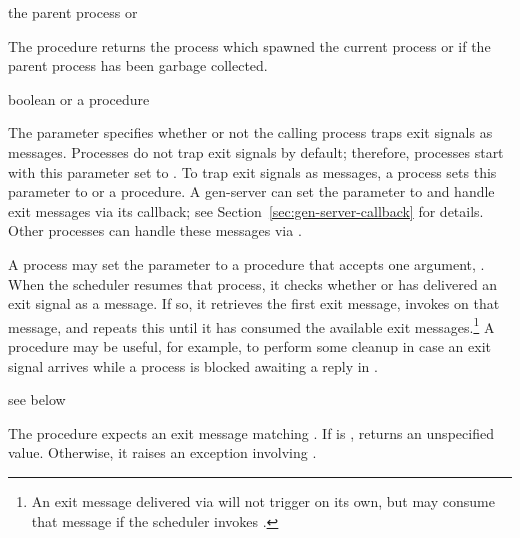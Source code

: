 \begin{procedure}
\end{procedure}
\returns{} the parent process or 

The  procedure returns the process which spawned
the current process or  if the parent process has been
garbage collected.

\begin{parameter}
\end{parameter}
\hasvalue{} boolean or a procedure

The  parameter specifies whether or not the
calling process traps exit signals as messages.
Processes do not trap exit signals by default; therefore,
processes start with this parameter set to .
To trap exit signals as messages, a process sets this parameter
to  or a procedure.
A gen-server can set the parameter to  and handle exit messages
via its  callback; see Section~\ref{sec:gen-server-callback} for details.
Other processes can handle these messages via .

A process may set the  parameter to a 
procedure that accepts one argument, .
When the scheduler resumes that process, it checks whether  or
 has delivered an exit signal as a message.
If so, it retrieves the first exit message, invokes  on that
message, and repeats this until it has consumed the available exit messages.\footnote{An exit message delivered via  will not trigger  on its own, but  may consume that message if
the scheduler invokes .}
A  procedure may be useful, for example, to perform some cleanup
in case an exit signal arrives while a process is blocked awaiting a reply in
.

\begin{procedure}
\end{procedure}
\returns{} see below

The  procedure expects an exit message 
matching .
If  is ,  returns
an unspecified value.
Otherwise, it raises an exception involving .

